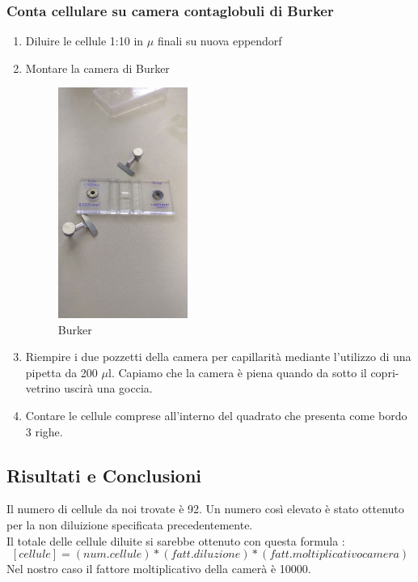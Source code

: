 \subsubsection{Conta cellulare su camera contaglobuli di Burker}
\begin{enumerate}
    \item Diluire le cellule 1:10 in $\mu$ finali su nuova eppendorf
    \item Montare la camera di Burker

    \begin{figure}[H]
    \centering
    \includegraphics[width = 0.4\textwidth]{./immagini/Burker.png}
    \caption{Burker}
    \end{figure}

    \item Riempire i due pozzetti della camera per capillarità mediante l'utilizzo di una pipetta da 200 $\mu$l. Capiamo che la camera è piena quando da sotto il copri-vetrino uscirà una goccia.
    \item Contare le cellule comprese all'interno del quadrato che presenta come bordo 3 righe.
\end{enumerate}

\subsection{Risultati e Conclusioni}

Il numero di cellule da noi trovate è 92. Un numero così elevato è stato ottenuto per la non diluizione specificata precedentemente. \\
Il totale delle cellule diluite si sarebbe ottenuto con questa formula :
    $$[cellule] = (num. cellule)*(fatt. diluzione)*(fatt. moltiplicativo camera)$$
Nel nostro caso il fattore moltiplicativo della camerà è 10000.



